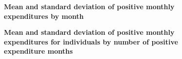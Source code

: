 \documentclass[letterpaper,12pt]{article}
\theoremstyle{definition}
\begin{document}
\begin{spacing}{1.5}{}
   \begin{figure}[h!]\centering\captionsetup{width=4.0in}
    \caption{\label{FigPosExpMonths1}\textbf{Mean and standard deviation of positive monthly expenditures by month}}
  \end{figure}
  
  \begin{figure}[h!]\centering\captionsetup{width=4.0in}
    \caption{\label{FigPosExpMonths2}\textbf{Mean and standard deviation of positive monthly expenditures for individuals by number of positive expenditure months}}
  \end{figure} 


\end{spacing}
\end{document}

